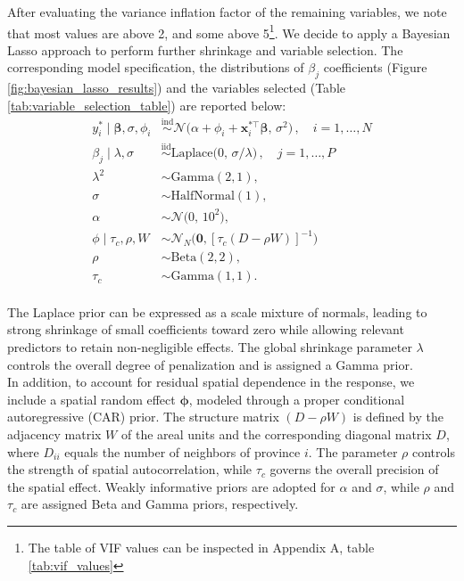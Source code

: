 After evaluating the variance inflation factor of the remaining variables, we note that most values are above 2, and some above 5\footnote{The table of VIF values can be inspected in Appendix A, table \ref{tab:vif_values}}.  We decide to apply a Bayesian Lasso approach \citep{Park2008} to perform further shrinkage and variable selection. The corresponding model specification, the distributions of $\beta_j$ coefficients (Figure \ref{fig:bayesian_lasso_results}) and the variables selected (Table \ref{tab:variable_selection_table}) are reported below:\\

\begin{align*}
    y^{\ast}_i \mid \boldsymbol{\beta}, \sigma, \phi_i 
        &\stackrel{\text{ind}}{\sim}\mathcal{N}\big(\alpha + \phi_i +  \boldsymbol{x}_i^{\ast \top} \boldsymbol{\beta},\, \sigma^2\big) \, ,
        \quad i = 1,\dots,N \\
    \beta_j \mid \lambda, \sigma 
        &\stackrel{\text{iid}}{\sim}\mathrm{Laplace}\big(0,\, \sigma / \lambda\big) \, ,
        \quad j = 1,\dots,P \\
    \lambda^2 &\sim \mathrm{Gamma}(2, 1), \\
    \sigma &\sim \mathrm{HalfNormal}(1), \\
    \alpha &\sim \mathcal{N}\big(0, \, 10^2),\\
    \phi \mid \tau_c, \rho, W &\sim \mathcal{N}_N \big(\boldsymbol{0},[\tau_c (D -\rho W)]^{-1} \big)\, \\
    \rho &\sim \mathrm{Beta}(2,2),\\
    \tau_c &\sim \mathrm{Gamma}(1,1).
\end{align*}\\

The Laplace prior can be expressed as a scale mixture of normals, leading to strong shrinkage of small coefficients toward zero while allowing relevant predictors to retain non-negligible effects. The global shrinkage parameter 
$\lambda$ controls the overall degree of penalization and is assigned a Gamma prior.\\

In addition, to account for residual spatial dependence in the response, we include a spatial random effect $\boldsymbol{\phi}$, modeled through a proper conditional autoregressive (CAR) prior. The structure matrix $(D - \rho W)$ is defined by the adjacency matrix $W$ of the areal units and the corresponding diagonal matrix $D$, where $D_{ii}$ equals the number of neighbors of province $i$. The parameter $\rho$ controls the strength of spatial autocorrelation, while $\tau_c$ governs the overall precision of the spatial effect. Weakly informative priors are adopted for $\alpha$ and $\sigma$, while $\rho$ and $\tau_c$ are assigned Beta and Gamma priors, respectively.\\

